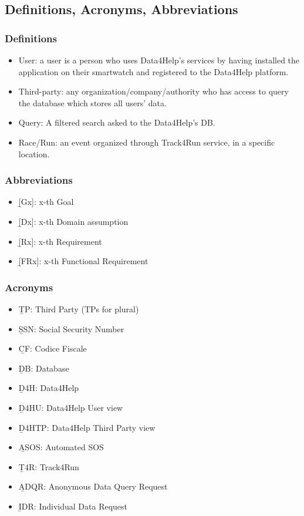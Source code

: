 {\color{secblue}\subsection{Definitions, Acronyms, Abbreviations}}
{\color{secblue}\subsubsection{Definitions}}
\begin{itemize}
\item User: a user is a person who uses Data4Help's services by having installed the application on their smartwatch and registered to the Data4Help platform.
\item Third-party: any organization/company/authority who has access to query the database which stores all users' data.
\item Query: A filtered search asked to the Data4Help's DB.
\item Race/Run: an event organized through Track4Run service, in a specific location.
\end{itemize}
{\color{secblue}\subsubsection{Abbreviations}}
\begin{itemize}
\item \b{[Gx]:} x-th Goal
\item \b{[Dx]:} x-th Domain assumption
\item \b{[Rx]:} x-th Requirement
\item \b{[FRx]:} x-th Functional Requirement
\end{itemize}

{\color{secblue}\subsubsection{Acronyms}}
\begin{itemize}
\item \b{TP:} Third Party (TPs for plural)
\item \b{SSN:} Social Security Number
\item \b{CF:} Codice Fiscale
\item \b{DB:} Database
\item \b{D4H:} Data4Help
\item \b{D4HU:} Data4Help User view
\item \b{D4HTP:} Data4Help Third Party view 
\item \b{ASOS:} Automated SOS
\item \b{T4R:} Track4Run
\item \b{ADQR:} Anonymous Data Query Request
\item \b{IDR:} Individual Data Request
\end{itemize}

